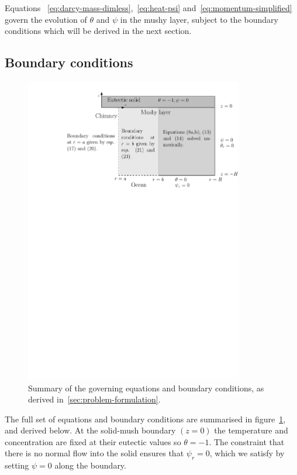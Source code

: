 \documentclass[11pt]{proc}
\makeatletter
\newcommand{\squeezeup}{\vspace{-5mm}}
\newcommand{\specialeqref}[2]{\begingroup
  \def\tagform@##1{\maketag@@@{(\ignorespaces##1\unskip\@@italiccorr#2)}}%
  \eqref{#1}\endgroup}
\makeatother
\begin{document}
Equations~\specialeqref{eq:darcy-mass-dimless}{a,b},~\eqref{eq:heat-psi} and~\eqref{eq:momentum-simplified} govern the evolution of $\theta$ and $\psi$ in the mushy layer, subject to the boundary conditions which will be derived in the next section.

\subsection{Boundary conditions}
\begin{figure}[ht!]
    \centering 
    \squeezeup
       \includegraphics[width=0.85\textwidth]{boundary-conditions}
       
       \setlength{\belowcaptionskip}{-10pt} %
       
       \caption{Summary of the governing equations and boundary conditions, as derived in~\autoref{sec:problem-formulation}.}
    \label{fig:boundary-conditions}
\end{figure}


The full set of equations and boundary conditions are summarised in figure~\ref{fig:boundary-conditions}, and derived below. At the solid-mush boundary $(z=0)$ the temperature and concentration are fixed at their eutectic values so $\theta = -1$. The constraint that there is no normal flow into the solid ensures that $\psi_r = 0$, which we satisfy by setting $\psi = 0$ along the boundary.
\end{document}
